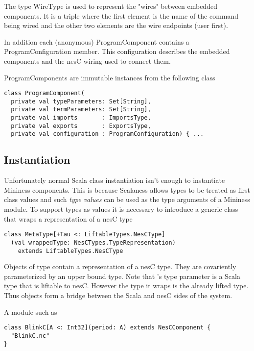 The type WireType is used to represent the "wires" between embedded components. It is a triple
where the first element is the name of the command being wired and the other two elements are
the wire endpoints (user first).

In addition each (anonymous) ProgramComponent contains a ProgramConfiguration member. This
configuration describes the embedded components and the nesC wiring used to connect them.

ProgramComponents are immutable instances from the following class

\singlespace
\begin{lstlisting}[language=scalaness]
class ProgramComponent(
  private val typeParameters: Set[String],
  private val termParameters: Set[String],
  private val imports       : ImportsType,
  private val exports       : ExportsType,
  private val configuration : ProgramConfiguration) { ...
\end{lstlisting}
\primaryspacing

\subsection{Instantiation}

Unfortunately normal Scala class instantiation isn't enough to instantiate Mininess components.
This is because Scalaness allows types to be treated as first class values and such \textit{type
  values} can be used as the type arguments of a Mininess module. To support types as values it
is necessary to introduce a generic class that wraps a representation of a nesC type

\singlespace
\begin{lstlisting}[language=scalaness]
class MetaType[+Tau <: LiftableTypes.NesCType]
  (val wrappedType: NesCTypes.TypeRepresentation)
    extends LiftableTypes.NesCType
\end{lstlisting}
\primaryspacing

Objects of type  contain a representation of a nesC type. They are
covariently parameterized by an upper bound type. Note that 's type
parameter is a Scala type that is liftable to nesC. However the type it wraps is the already
lifted type. Thus  objects form a bridge between the Scala and nesC sides
of the system.

A module such as

\singlespace
\begin{lstlisting}[language=scalaness]
class BlinkC[A <: Int32](period: A) extends NesCComponent {
  "BlinkC.nc"
}
\end{lstlisting}
\primaryspacing

